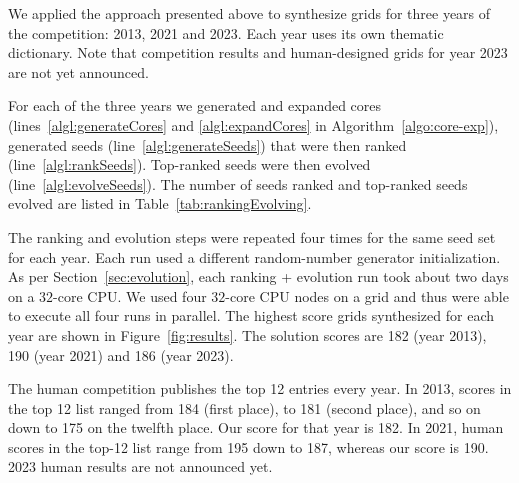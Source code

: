 We applied the approach presented above to synthesize grids for three years of the competition: 2013, 2021 and 2023. Each year uses its own thematic dictionary. Note that competition results and human-designed grids for year 2023 are not yet announced.

For each of the three years we generated and expanded cores (lines~\ref{algl:generateCores} and \ref{algl:expandCores} in Algorithm~\ref{algo:core-exp}), generated seeds (line~\ref{algl:generateSeeds}) that were then ranked (line~\ref{algl:rankSeeds}). Top-ranked seeds were then evolved (line~\ref{algl:evolveSeeds}). The number of seeds ranked and top-ranked seeds evolved are listed in Table~\ref{tab:rankingEvolving}.


The ranking and evolution steps were repeated four times for the same seed set for each year. Each run used a different random-number generator initialization. As per Section~\ref{sec:evolution}, each ranking + evolution run took about two days on a $32$-core CPU. We used four $32$-core CPU nodes on a grid and thus were able to execute all four runs in parallel. The highest score grids synthesized for each year are shown in Figure~\ref{fig:results}. The solution scores are 182 (year 2013), 190 (year 2021) and 186 (year 2023).

The human competition publishes the top 12 entries every year.
In 2013, scores in the top 12 list ranged from 184 (first place), to 181 (second place), and so on down to 175 on the twelfth place.
Our score for that year is 182.
In 2021, human scores in the top-12 list range from 195 down to 187, whereas our score is 190.
2023 human results are not announced yet.



